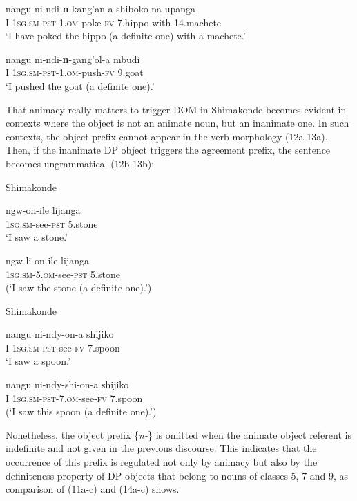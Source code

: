 \documentclass[output=paper]{langsci/langscibook}
\begin{document}
\ea
\gll nangu         ni-ndi-\textbf{n}{}-kang'an-a                     shiboko           na       upanga\\
     I                 \textsc{1sg.sm-pst-1.om}{}-poke-\textsc{fv}         7.hippo            with   14.machete\\
\glt ‘I have poked the hippo (a definite one) with a machete.’
\z


\ea
\gll nangu         ni-ndi-\textbf{n}{}-gang'ol-a                      mbudi\\
     I                 \textsc{1sg.sm-pst-1.om}{}-push-\textsc{fv}          9.goat\\
\glt ‘I pushed the goat (a definite one).’
\z

{That animacy really matters to trigger DOM in Shimakonde becomes evident in contexts where the object is not an animate noun, but an inanimate one. In such contexts, the object prefix cannot appear in the verb morphology (12a-13a). Then, if the inanimate DP object triggers the agreement prefix, the sentence becomes ungrammatical (12b-13b):}

{{Shimakonde}}

\ea
\gll ngw-on-ile                     lijanga\\
     \textsc{1sg.sm}{}-see-\textsc{pst}             5.stone\\
\glt ‘I saw a stone.’
\z

\ea
\gll *ngw-li-on-ile                        lijanga\\
     \textsc{1sg.sm-5.om}{}-see-\textsc{pst}            5.stone\\
\glt (‘I saw the stone (a definite one).’)
\z

{Shimakonde}

\ea
\gll nangu       ni-ndy-on-a                   shijiko\\
     I               \textsc{1sg.sm-pst}{}-see-\textsc{fv}        7.spoon\\
\glt ‘I saw a spoon.’
\z

\ea
\gll *nangu      ni-ndy-shi-on-a                      shijiko\\
     I                \textsc{1sg.sm-pst-7.om}{}-see-\textsc{fv}        7.spoon\\
\glt (‘I saw this spoon (a definite one).’)
\z

Nonetheless, the object prefix \{{\textit{n-}}\} is omitted when the animate object referent is indefinite and not given in the previous discourse. This indicates that the occurrence of this prefix is regulated not only by animacy but also by the definiteness property of DP objects that belong to nouns of classes 5, 7 and 9, as comparison of (11a-c) and (14a-c) shows.
\end{document}
